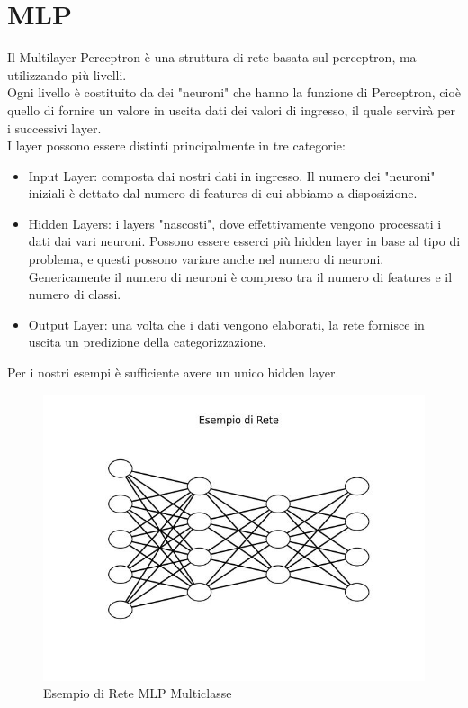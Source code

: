 \documentclass{article}
\begin{document}
    \section{MLP}\label{sec:mlp}
        Il Multilayer Perceptron è una struttura di rete basata sul perceptron, ma utilizzando più livelli.\\
        Ogni livello è costituito da dei "neuroni" che hanno la funzione di Perceptron, cioè quello di fornire un valore in uscita dati dei valori di ingresso, il quale servirà per i successivi layer. \\
        I layer possono essere distinti principalmente in tre categorie:
        \begin{itemize}
            \item Input Layer: composta dai nostri dati in ingresso.
            Il numero dei "neuroni" iniziali è dettato dal numero di features di cui abbiamo a disposizione.
            \item Hidden Layers: i layers "nascosti", dove effettivamente vengono processati i dati dai vari neuroni.
            Possono essere esserci più hidden layer in base al tipo di problema, e questi possono variare anche nel numero di neuroni.
            Genericamente il numero di neuroni è compreso tra il numero di features e il numero di classi.
            \item Output Layer: una volta che i dati vengono elaborati, la rete fornisce in uscita un predizione della categorizzazione.
        \end{itemize}
        Per i nostri esempi è sufficiente avere un unico hidden layer.
        \begin{figure}[H]
            \centering
            \includegraphics[scale=0.50]{neural_network}
            \caption{Esempio di Rete MLP Multiclasse}
            \label{fig:figure1}
        \end{figure}
\end{document}
